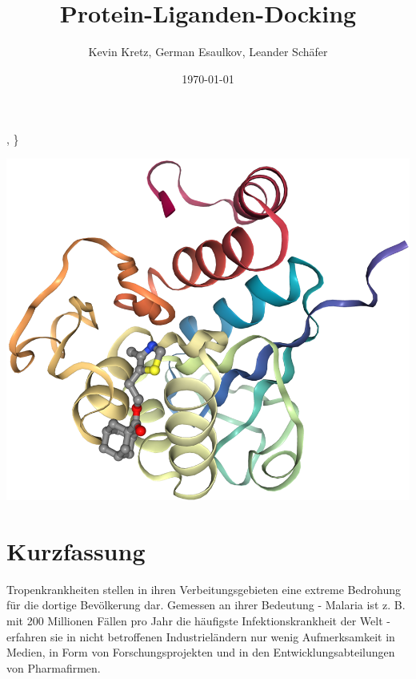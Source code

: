 \documentclass[11pt]{article}
\title{Protein-Liganden-Docking}
\author{Kevin Kretz, German Esaulkov, Leander Schäfer}
\date{\today}
\begin{document}
    {\thecsvrow, \}%


    \maketitle

    \includegraphics[width=\linewidth]{protein-ligand}

    \pagebreak

    \tableofcontents


    \section{Kurzfassung}\label{sec:kurzfassung}



    Tropenkrankheiten stellen in ihren Verbeitungsgebieten eine extreme Bedrohung für die dortige Bevölkerung dar. Gemessen an ihrer Bedeutung - Malaria ist z. B. mit 200 Millionen Fällen pro Jahr die häufigste Infektionskrankheit der Welt  - erfahren sie in nicht betroffenen Industrieländern nur wenig Aufmerksamkeit in Medien, in Form von Forschungsprojekten und in den Entwicklungsabteilungen von Pharmafirmen.

}
\end{document}
